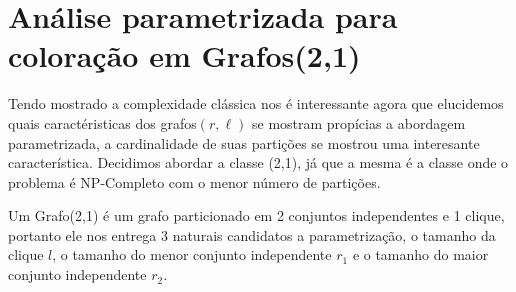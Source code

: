 \chapter{Análise parametrizada para coloração em Grafos(2,1)}
Tendo mostrado a complexidade clássica nos é interessante agora que elucidemos quais caractéristicas dos grafos$(r,\ell)$ se mostram propícias a abordagem parametrizada, a cardinalidade de suas partições se mostrou uma interesante característica.
Decidimos abordar a classe (2,1), já que a mesma é a classe onde o problema é NP-Completo com o menor número de partições.

Um Grafo(2,1) é um grafo particionado em 2 conjuntos independentes e 1 clique, portanto ele nos entrega 3 naturais candidatos a parametrização, o tamanho da clique $l$, o tamanho do menor conjunto independente $r_1$ e o tamanho do maior conjunto independente $r_2$.

